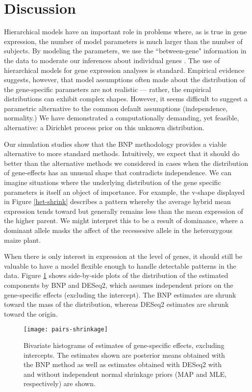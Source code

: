 \section{Discussion}
Hierarchical models have an important role in problems where, as is true in gene expression, the number of model parameters is much larger than the number of subjects. By modeling the parameters, we use the ``between-gene" information in the data to moderate our inferences about individual genes . The use of hierarchical models for gene expression analyses is standard. Empirical evidence suggests, however, that model assumptions often made about the distribution of the gene-specific parameters are not realistic --- rather, the empirical distributions can exhibit complex shapes. However, it seems difficult to suggest a parametric alternative to the common default assumptions (independence, normality.) We have demonstrated a computationally demanding, yet feasible, alternative: a Dirichlet process prior on this unknown distribution.

Our simulation studies show that the BNP methodology provides a viable alternative to more standard methods. Intuitively, we expect that it should do better than the alternative methods we considered in cases when the distribution of gene-effects has an unusual shape that contradicts independence. We can imagine situations where the underlying distribution of the gene specific parameters is itself an object of importance. For example, the v-shape displayed in Figure \ref{het-shrink} describes a pattern whereby the average hybrid mean expression tends toward but generally remains less than the mean expression of the higher parent. We might interpret this to be a result of dominance, where a dominant allele masks the affect of the recessesive allele in the heterozygous maize plant.

When there is only interest in expression at the level of genes, it should still be valuable to have a model flexible enough to handle detectable patterns in the data. Figure \ref{all-shrink} shows side-by-side plots of the distribution of the estimated components by BNP and DESeq2, which assumes independent priors on the gene-specific effects (excluding the intercept). The BNP estimates are shrunk toward the mass of the distribution, whereas DESeq2 estimates are shrunk toward the origin.


\begin{landscape}
\centering
\begin{figure}
\texttt{[image: pairs-shrinkage]}
\caption{Bivariate histograms of estimates of gene-specific effects, excluding intercepts. The estimates shown are posterior means obtained with the BNP method as well as estimates obtained with DESeq2 with and without independent normal shrinkage priors (MAP and MLE, respectively) are shown.}
\label{all-shrink}
\end{figure}
\end{landscape}

